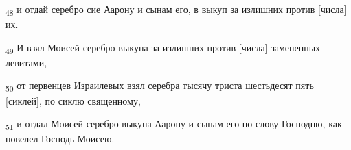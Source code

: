 \begin{tcolorbox}
\textsubscript{48} и отдай серебро сие Аарону и сынам его, в выкуп за излишних против [числа] их.
\end{tcolorbox}
\begin{tcolorbox}
\textsubscript{49} И взял Моисей серебро выкупа за излишних против [числа] замененных левитами,
\end{tcolorbox}
\begin{tcolorbox}
\textsubscript{50} от первенцев Израилевых взял серебра тысячу триста шестьдесят пять [сиклей], по сиклю священному,
\end{tcolorbox}
\begin{tcolorbox}
\textsubscript{51} и отдал Моисей серебро выкупа Аарону и сынам его по слову Господню, как повелел Господь Моисею.
\end{tcolorbox}
